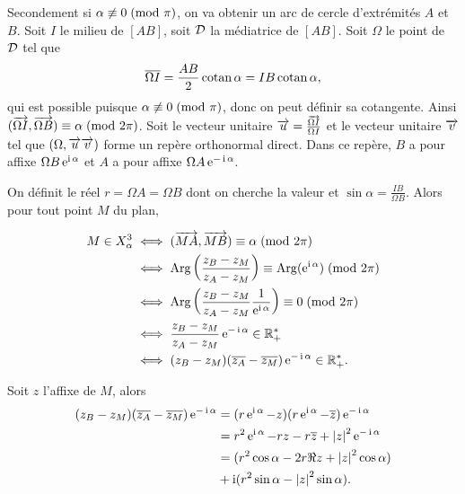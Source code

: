 Secondement si  \(\alpha \not\equiv 0\!\pmod {\pi}\), on va obtenir un arc de cercle
d'extrémités \(A\) et \(B\). Soit \(I\) le milieu de \([AB]\), soit \(\mathcal{D}\) la
médiatrice de \([AB]\). Soit \(\Omega\) le point de \(\mathcal{D}\) tel que
\begin{equation}
  \overline{\Omega I} = \frac{AB}{2}\operatorname{cotan} \alpha = IB \operatorname{cotan} \alpha,
\end{equation}
qui est possible puisque \(\alpha \not\equiv 0\!\pmod {\pi}\), donc on peut définir
sa cotangente. Ainsi \((\overrightarrow{\Omega I},\overrightarrow{\Omega
B}) \equiv \alpha\!\pmod {2\pi}\).  Soit le vecteur unitaire \(\overrightarrow{u} = \frac{\overrightarrow{\Omega
I}}{\Omega I}\) et le vecteur unitaire \(\overrightarrow{v}\) tel que \((\Omega, \overrightarrow{u} \overrightarrow{v})\)
forme un repère orthonormal direct. Dans ce repère, \(B\) a pour affixe
\(\Omega B \operatorname{e}^{\operatorname{i} \alpha}\) et \(A\) a pour affixe \(\Omega A \operatorname{e}^{-\operatorname{i}
\alpha}\).

On définit le réel \(r = \Omega A = \Omega B\) dont on cherche la valeur et
\(\sin \alpha = \frac{IB}{\Omega B}\). Alors pour tout point \(M\) du plan,

\begin{align}
  M \in X_{\alpha}^3 & \iff (\overrightarrow{MA},\overrightarrow{MB}) \equiv \alpha\!\pmod {2\pi} \\
                     & \iff \operatorname{Arg}\left(\frac{z_B - z_M}{z_A -
                     z_M}\right) \equiv \operatorname{Arg}(\operatorname{e}^{\operatorname{i} \alpha})\!\pmod {2\pi}\\
                     & \iff \operatorname{Arg}\left(\frac{z_B - z_M}{z_A - z_M}
                     \frac{1}{\operatorname{e}^{\operatorname{i} \alpha}}\right) \equiv 0\!\pmod {2\pi}\\
                     & \iff \frac{z_B - z_M}{z_A - z_M} \operatorname{e}^{-\operatorname{i} \alpha} \in
                     \mathbb{R}_{+}^{*}\\
                     & \iff (z_B - z_M)(\overline{z_A}-\overline{z_M})\operatorname{e}^{-\operatorname{i} \alpha}
                     \in \mathbb{R}_{+}^{*}.
\end{align}

Soit \(z\) l'affixe de \(M\), alors
\begin{align}
  (z_B - z_M)(\overline{z_A}-\overline{z_M})\operatorname{e}^{-\operatorname{i} \alpha} & = (r\operatorname{e}^{\operatorname{i} \alpha} -
  z)(r\operatorname{e}^{\operatorname{i} \alpha} - \overline{z})\operatorname{e}^{-\operatorname{i} \alpha} \\
                                                   & = r^2 \operatorname{e}^{\operatorname{i} \alpha} -
                                                   rz - r\overline{z} +
                                                   \left\lvert z\right\rvert^2\operatorname{e}^{-\operatorname{i} \alpha}
                                                   \\
                                                   & = (r^2\cos \alpha -
  2r\Re{z} + \left\lvert z\right\rvert^2\cos \alpha) \\ &+ \operatorname{i}(r^2\sin \alpha - \left\lvert z\right\rvert^2\sin
  \alpha). \notag
\end{align}

